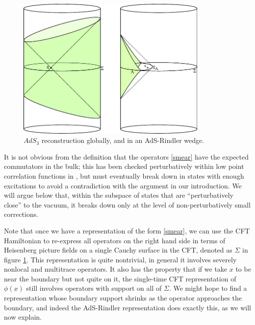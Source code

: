 \documentclass[11pt]{article}
\begin{document}
\begin{figure}
\begin{center}
\includegraphics[height=7cm]{globalfig.pdf}
\caption{$AdS_3$ reconstruction globally, and in an AdS-Rindler wedge.}\label{globalfig}
\end{center}
\end{figure}

It is not obvious from the definition that the operators \eqref{smear} have the expected commutators in the bulk; this has been checked perturbatively within low point correlation functions in \cite{Kabat:2011rz}, but must eventually break down in states with enough excitations to avoid a contradiction with the argument in our introduction.  We will argue below that, within the subspace of states that are ``perturbatively close'' to the vacuum, it breaks down only at the level of non-perturbatively small corrections.  


Note that once we have a representation of the form \eqref{smear}, we can use the CFT Hamiltonian to re-express all operators on the right hand side in terms of Heisenberg picture fields on a single Cauchy surface in the CFT, denoted as $\Sigma$ in figure \ref{globalfig}.  This representation is quite nontrivial, in general it involves severely nonlocal and multitrace operators.  It also has the property that if we take $x$ to be near the boundary but not quite on it, the single-time CFT representation of $\phi(x)$ still involves operators with support on all of $\Sigma$.  We might hope to find a representation whose boundary support shrinks as the operator approaches the boundary, and indeed the AdS-Rindler representation does exactly this, as we will now explain.  
\end{document}
